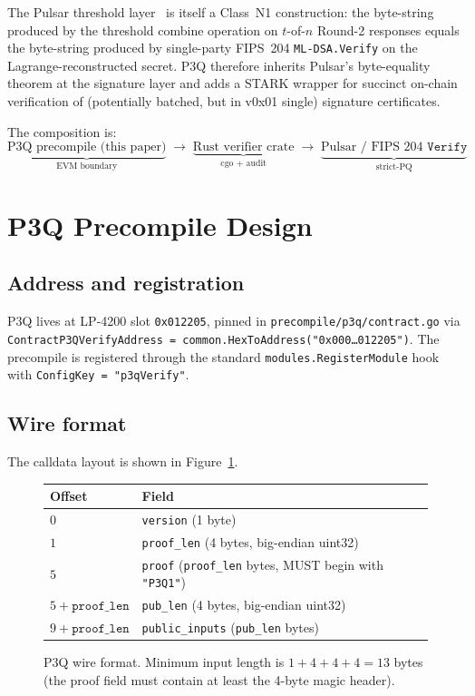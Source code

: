 \documentclass[11pt,a4paper]{article}
\begin{document}
The Pulsar threshold layer~\cite{pulsar} is itself a Class~N1
construction: the byte-string produced by the threshold combine
operation on $t$-of-$n$ Round-2 responses equals the byte-string
produced by single-party FIPS~204 \texttt{ML-DSA.Verify} on the
Lagrange-reconstructed secret. P3Q therefore inherits Pulsar's
byte-equality theorem at the signature layer and adds a STARK wrapper
for succinct on-chain verification of (potentially batched, but in
v0x01 single) signature certificates.

The composition is:
\[
\underbrace{\text{P3Q precompile (this paper)}}_{\text{EVM boundary}}
\;\longrightarrow\;
\underbrace{\text{Rust verifier crate}}_{\text{cgo + audit}}
\;\longrightarrow\;
\underbrace{\text{Pulsar / FIPS 204 } \mathtt{Verify}}_{\text{strict-PQ}}
\]

\section{P3Q Precompile Design}\label{sec:design}

\subsection{Address and registration}

P3Q lives at LP-4200 slot \texttt{0x012205}, pinned in
\texttt{precompile/p3q/contract.go} via
\texttt{ContractP3QVerifyAddress = common.HexToAddress("0x000\ldots012205")}.
The precompile is registered through the standard
\texttt{modules.RegisterModule} hook with \texttt{ConfigKey =
"p3qVerify"}.

\subsection{Wire format}\label{sec:wire}

The calldata layout is shown in Figure~\ref{fig:wire}.

\begin{figure}[h]
\centering
\begin{tabular}{ll}
\toprule
Offset & Field \\
\midrule
$0$ & \texttt{version} (1 byte) \\
$1$ & \texttt{proof\_len} (4 bytes, big-endian uint32) \\
$5$ & \texttt{proof} (\texttt{proof\_len} bytes, MUST begin with \texttt{"P3Q1"}) \\
$5+\texttt{proof\_len}$ & \texttt{pub\_len} (4 bytes, big-endian uint32) \\
$9+\texttt{proof\_len}$ & \texttt{public\_inputs} (\texttt{pub\_len} bytes) \\
\bottomrule
\end{tabular}
\caption{P3Q wire format. Minimum input length is
$1+4+4+4=13$ bytes (the proof field must contain at least the
4-byte magic header).}
\label{fig:wire}
\end{figure}
\end{document}
